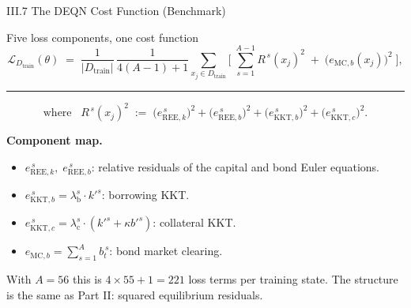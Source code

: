 \documentclass[aspectratio=169,11pt]{beamer}
\newcommand{\emphc}[1]{\textcolor{harvardcrimson}{#1}}
\newcommand{\Loss}{\mathcal{L}}
\begin{document}
\begin{frame}{III.7 The DEQN Cost Function (Benchmark)}
\footnotesize
\begin{block}{Five loss components, one cost function}
\vspace{-2pt}
\[
\Loss_{D_{\text{train}}}(\theta) \;=\; \frac{1}{|D_{\text{train}}|}\,\frac{1}{4(A-1)+1}\!
\sum_{x_j \in D_{\text{train}}}\!\Biggl[\;\sum_{s=1}^{A-1} R^{\,s}(x_j)^2 \;+\; \bigl(e_{\text{MC},b}(x_j)\bigr)^2\;\Biggr],
\]

\vspace{4pt}
\hrule
\vspace{4pt}
\[
\text{where}\;\;\;R^{\,s}(x_j)^2 \;:=\; \bigl(e_{\text{REE},k}^{\,s}\bigr)^2 + \bigl(e_{\text{REE},b}^{\,s}\bigr)^2 + \bigl(e_{\text{KKT},b}^{\,s}\bigr)^2 + \bigl(e_{\text{KKT},c}^{\,s}\bigr)^2.
\]
\vspace{-4pt}
\end{block}

\vspace{-2pt}
\textbf{Component map.}
\begin{itemize}\itemsep0pt
    \item $e_{\text{REE},k}^{\,s},\;e_{\text{REE},b}^{\,s}$: relative residuals of the capital and bond Euler equations.
    \item $e_{\text{KKT},b}^{\,s} = \lambda_{\text{b}}^s \cdot k'^s$: borrowing KKT.
    \item $e_{\text{KKT},c}^{\,s} = \lambda_{\text{c}}^s \cdot (k'^s + \kappa b'^s)$: collateral KKT.
    \item $e_{\text{MC},b} = \sum_{s=1}^{A} b_t^{\,s}$: bond market clearing.
\end{itemize}

\vspace{0.2em}
{\scriptsize With $A = 56$ this is \emphc{$4 \times 55 + 1 = 221$} loss terms per training state.  The structure is the same as Part II: squared equilibrium residuals.}
\end{frame}
\end{document}

